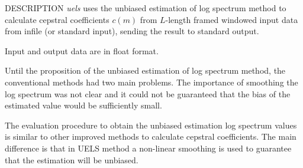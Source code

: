 \begin{synopsis}
\item [uels] [ --m $M$ ] [ --l $L$ ] [ --q $Q$ ] [ --i $I$ ] 
	     [ --j $J$ ] [ --d $D$ ] [ --e $e$ ] [ --E $E$ ] [ {\em infile} ]
\end{synopsis}

\begin{qsection}{DESCRIPTION}
{\em uels} uses the unbiased estimation of log spectrum method 
to calculate cepstral coefficients $c(m)$ 
from $L$-length framed windowed input data
from {\rm infile} (or standard input), 
sending the result to standard output.

Input and output data are in float format.

Until the proposition of the unbiased estimation of
log spectrum method, the conventional methods had
two main problems.
The importance of smoothing the log spectrum
was not clear
and it could not be guaranteed that
the bias of the estimated value would be sufficiently small.

The evaluation procedure to obtain the unbiased estimation
log spectrum values is similar to other improved methods to
calculate cepstral coefficients.
The main difference is that in UELS method a non-linear smoothing
is used to guarantee that the estimation will be unbiased.
\end{qsection}

\begin{options}
\end{options}

